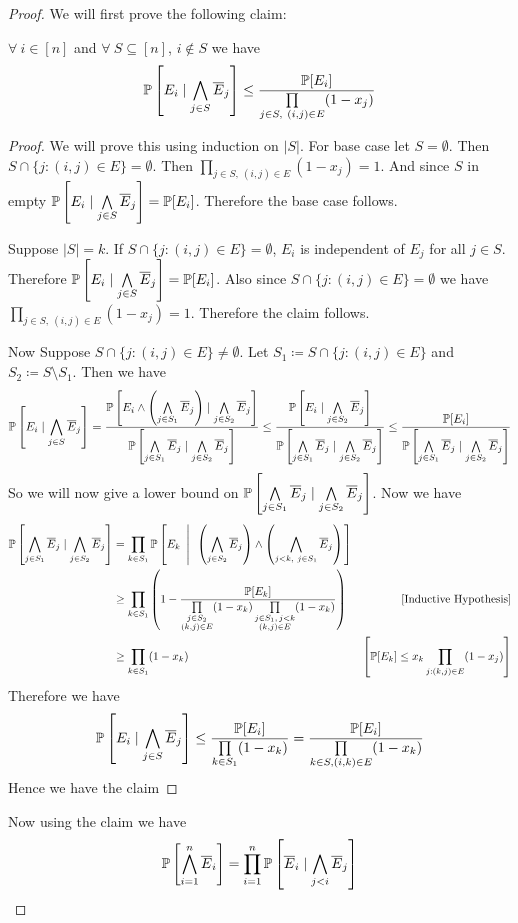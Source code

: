 \documentclass[twoside]{article}
\begin{document}
\begin{proof}
	We will first prove the following claim:\begin{claimwidth}
		\begin{claim}{}{}
			$\forall\ i\in[n]$ and $\forall\ S\subseteq[n]$, $i\notin S$ we have $$\mathbb{P}\left[E_i\mid \bigwedge_{j\in S}\overline{E}_j\right]\leq\frac{\mathbb{P}[E_i]}{\prod\limits_{j\in S,\ (i,j)\in E}(1-x_j)}$$
		\end{claim}
		\begin{proof}
			We will prove this using induction on $|S|$. For base case let $S=\emptyset$. Then $S\cap\{j\colon (i,j)\in E\}=\emptyset$. Then $\prod\limits_{j\in S,\ (i,j)\in E}(1-x_j)=1$. And since $S$ in empty $\mathbb{P}\left[E_i\mid \bigwedge\limits_{j\in S}\overline{E}_j\right]=\mathbb{P}[E_i]$. Therefore the base case follows. \parinn
			
			Suppose $|S|=k$. If $S\cap\{j\colon (i,j)\in E\}=\emptyset$, $E_i$ is independent of $E_j$ for all $j\in S$. Therefore $\mathbb{P}\left[E_i\mid \bigwedge\limits_{j\in S}\overline{E}_j\right]=\mathbb{P}[E_i]$. Also since $S\cap\{j\colon (i,j)\in E\}=\emptyset$ we have $\prod\limits_{j\in S,\ (i,j)\in E}(1-x_j)=1$. Therefore the claim follows.
			
			Now Suppose $S\cap\{j\colon (i,j)\in E\}\neq\emptyset$. Let $S_1\coloneqq S\cap\{j\colon (i,j)\in E\}$ and $S_2\coloneqq S\setminus S_1$. Then we have $$\mathbb{P}\left[E_i\mid \bigwedge_{j\in S}\overline{E}_j\right]=\frac{\mathbb{P}\left[ E_i\wedge \left( \bigwedge\limits_{j\in S_1}\overline{E}_j\right)\mid \bigwedge\limits_{j\in S_2}\overline{E}_j \right]}{\mathbb{P}\left[  \bigwedge\limits_{j\in S_1}\overline{E}_j\mid \bigwedge\limits_{j\in S_2}\overline{E}_j \right]}\leq \frac{\mathbb{P}\left[ E_i\mid \bigwedge\limits_{j\in S_2}\overline{E}_j \right]}{\mathbb{P}\left[  \bigwedge\limits_{j\in S_1}\overline{E}_j\mid \bigwedge\limits_{j\in S_2}\overline{E}_j \right]}\leq\frac{\mathbb{P}[ E_i]}{\mathbb{P}\left[  \bigwedge\limits_{j\in S_1}\overline{E}_j\mid \bigwedge\limits_{j\in S_2}\overline{E}_j \right]} $$So we will now give a lower bound on $\mathbb{P}\left[  \bigwedge\limits_{j\in S_1}\overline{E}_j\mid \bigwedge\limits_{j\in S_2}\overline{E}_j \right]$. Now we have \begin{align*}
				\mathbb{P}\left[  \bigwedge\limits_{j\in S_1}\overline{E}_j\mid \bigwedge\limits_{j\in S_2}\overline{E}_j \right] & = \prod_{k\in S_1}\mathbb{P}\left[ E_k\ \left|\ \ \left(\bigwedge_{j\in S_2}\overline{E}_j\right) \wedge \left( \bigwedge_{j<k,\ j\in S_1}\overline{E}_j\right) \right.  \right]\\
				& \geq \prod_{k\in S_1} \left(1-\frac{\mathbb{P}[E_k]}{\prod\limits_{\substack{j\in S_2\\ (k,j)\in E}}(1-x_k)  \prod\limits_{\substack{j\in S_1,\, j<k\\ (k,j)\in E}}(1-x_k)  }   \right) &[\text{Inductive Hypothesis}]\\
				& \geq \prod_{k\in S_1}(1-x_k)& \left[\mathbb{P}[E_k]\leq x_k\prod_{j:(k,j)\in E}(1-x_j)\right]
			\end{align*}Therefore we have $$\mathbb{P}\left[E_i\mid \bigwedge_{j\in S}\overline{E}_j\right]\leq \frac{\mathbb{P}[E_i]}{\prod\limits_{k\in S_1}(1-x_k)}=\frac{\mathbb{P}[E_i]}{\prod\limits_{k\in S,(i,k)\in E}(1-x_k)}$$Hence we have the claim	\end{proof}
	\end{claimwidth}
	Now using the claim we have $$\mathbb{P}\left[ \bigwedge_{i=1}^n\overline{E}_i \right]=\prod_{i=1}^n\mathbb{P}\left[ \overline{E}_i\mid\bigwedge_{j<i}\overline{E}_j \right]$$
\end{proof}
\end{document}
